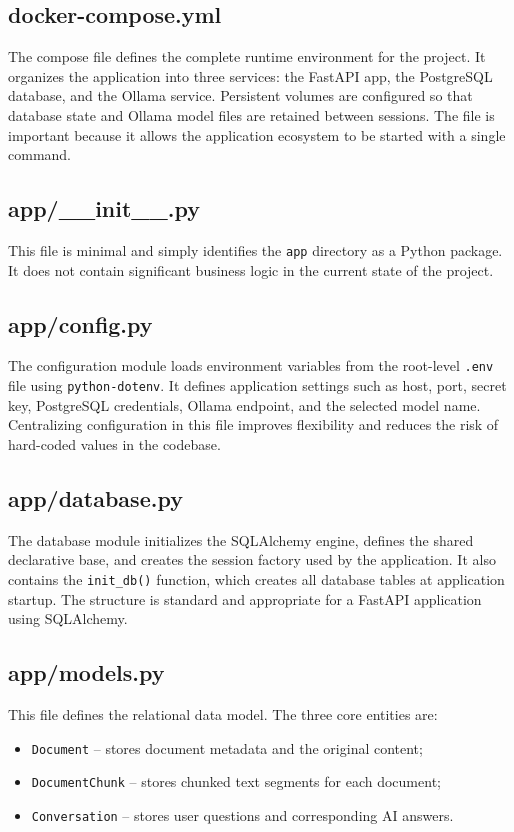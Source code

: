 ﻿\documentclass[11pt,a4paper]{article}
\begin{document}
\subsection{docker-compose.yml}
The compose file defines the complete runtime environment for the project. It organizes the application into three services: the FastAPI app, the PostgreSQL database, and the Ollama service. Persistent volumes are configured so that database state and Ollama model files are retained between sessions. The file is important because it allows the application ecosystem to be started with a single command.

\subsection{app/__init__.py}
This file is minimal and simply identifies the \texttt{app} directory as a Python package. It does not contain significant business logic in the current state of the project.

\subsection{app/config.py}
The configuration module loads environment variables from the root-level \texttt{.env} file using \texttt{python-dotenv}. It defines application settings such as host, port, secret key, PostgreSQL credentials, Ollama endpoint, and the selected model name. Centralizing configuration in this file improves flexibility and reduces the risk of hard-coded values in the codebase.

\subsection{app/database.py}
The database module initializes the SQLAlchemy engine, defines the shared declarative base, and creates the session factory used by the application. It also contains the \texttt{init\_db()} function, which creates all database tables at application startup. The structure is standard and appropriate for a FastAPI application using SQLAlchemy.

\subsection{app/models.py}
This file defines the relational data model. The three core entities are:

\begin{itemize}[leftmargin=*]
    \item \texttt{Document} -- stores document metadata and the original content;
    \item \texttt{DocumentChunk} -- stores chunked text segments for each document;
    \item \texttt{Conversation} -- stores user questions and corresponding AI answers.
\end{itemize}
\end{document}
